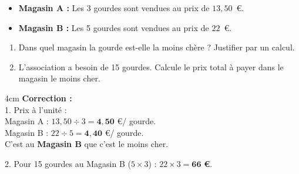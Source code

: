 \documentclass[a4paper]{book}
\begin{document}
{%
    \begin{exercice}
        \begin{itemize}
            \item \textbf{Magasin A :} Les 3 gourdes sont vendues au prix de $13,50$~\euro.
            \item \textbf{Magasin B :} Les 5 gourdes sont vendues au prix de $22$~\euro.
        \end{itemize}
        \begin{enumerate}
            \item Dans quel magasin la gourde est-elle la moins chère ? Justifier par un calcul.
            \item L'association a besoin de 15 gourdes. Calcule le prix total à payer dans le magasin le moins cher.
        \end{enumerate}
    
        \begin{ZoneReponse}{4cm}
            \textbf{Correction :} \\
            1. Prix à l'unité : \\
            Magasin A : $13,50 \div 3 = \mathbf{4,50}$ \euro / gourde. \\
            Magasin B : $22 \div 5 = \mathbf{4,40}$ \euro / gourde. \\
            C'est au \textbf{Magasin B} que c'est le moins cher. 

            \medskip
            
            2. Pour 15 gourdes au Magasin B ($5 \times 3$) : $22 \times 3 = \mathbf{66}$ \textbf{\euro}.
        \end{ZoneReponse}
    \end{exercice}
}
\end{document}
